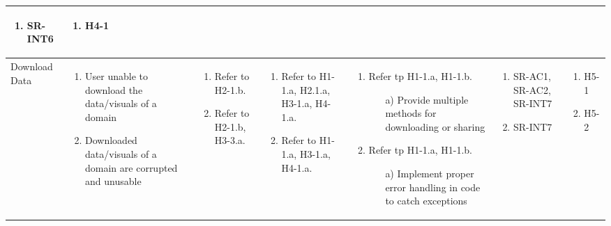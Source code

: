 \documentclass{article}
\begin{document}
\begin{landscape}
\begin{longtable}{|p{3cm}|p{3cm}|p{4cm}|p{4cm}|p{3cm}|p{2cm}|p{3cm}|}
  \begin{enumerate}[leftmargin=*]
       \item SR-INT6
  \end{enumerate} &
  \begin{enumerate}[leftmargin=*]
       \item H4-1
  \end{enumerate} \\
  \hline
 Download Data  & 
  \begin{enumerate}[leftmargin=*]
    \item User unable to download the data/visuals of a domain
    \item Downloaded data/visuals of a domain are corrupted and unusable
  \end{enumerate} & 
  \begin{enumerate}[leftmargin=*]
      \item Refer to H2-1.b.
      \item Refer to H2-1.b, H3-3.a.
  \end{enumerate} &
  \begin{enumerate}[leftmargin=*]
    \item Refer to H1-1.a, H2.1.a, H3-1.a, H4-1.a.
    \item Refer to H1-1.a, H3-1.a, H4-1.a.
  \end{enumerate} &
  \begin{enumerate}[leftmargin=*]
       \item Refer tp H1-1.a, H1-1.b.
       \begin{enumerate}
        \item[a)] Provide multiple methods for downloading or sharing
    \end{enumerate}
       \item Refer tp H1-1.a, H1-1.b.
       \begin{enumerate}
        \item[a)] Implement proper error handling in code to catch exceptions
    \end{enumerate}
  \end{enumerate} &
  \begin{enumerate}[leftmargin=*]
       \item SR-AC1, SR-AC2, SR-INT7
       \item SR-INT7
  \end{enumerate} &
  \begin{enumerate}[leftmargin=*]
       \item H5-1
       \item H5-2
  \end{enumerate} \\
  \hline
  \end{longtable}
\end{landscape}
\restoregeometry
\end{document}
